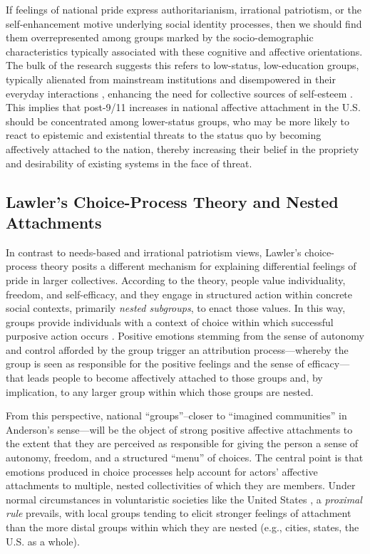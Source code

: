 \documentclass[12pt,letterpaper]{article}
\begin{document}
If feelings of national pride express authoritarianism, irrational patriotism, or the self-enhancement motive underlying social identity processes, then we should find them overrepresented among groups marked by the socio-demographic characteristics typically associated with these cognitive and affective orientations. The bulk of the research suggests this refers to low-status, low-education groups, typically alienated from mainstream institutions and disempowered in their everyday interactions \citep{wuthnow2019left-c34}, enhancing the need for collective sources of self-esteem \citep{collins1986weberian, jost2017working-608, jost2003social-206}. This implies that post-9/11 increases in national affective attachment in the U.S. should be concentrated among lower-status groups, who may be more likely to react to epistemic and existential threats to the status quo by becoming affectively attached to the nation, thereby increasing their belief in the propriety and desirability of existing systems in the face of threat.

\subsection{Lawler's Choice-Process Theory and Nested Attachments}

In contrast to needs-based and irrational patriotism views, Lawler's \citeyearpar{lawler1992affective-8c8} choice-process theory posits a different mechanism for explaining differential feelings of pride in larger collectives. According to the theory, people value individuality, freedom, and self-efficacy, and they engage in structured action within concrete social contexts, primarily \textit{nested subgroups}, to enact those values. In this way, groups provide individuals with a context of choice within which successful purposive action occurs \citep{fine2021hinge}. Positive emotions stemming from the sense of autonomy and control afforded by the group trigger an attribution process---whereby the group is seen as responsible for the positive feelings and the sense of efficacy---that leads people to become affectively attached to those groups and, by implication, to any larger group within which those groups are nested.

From this perspective, national ``groups''--closer to ``imagined communities'' in Anderson's \citeyearpar{anderson1991imagined-c99} sense---will be the object of strong positive affective attachments to the extent that they are perceived as responsible for giving the person a sense of autonomy, freedom, and a structured ``menu'' of choices. The central point is that emotions produced in choice processes help account for actors' affective attachments to multiple, nested collectivities of which they are members. Under normal circumstances in voluntaristic societies like the United States \citep{swidler1992inequality}, a \textit{proximal rule} prevails, with local groups tending to elicit stronger feelings of attachment than the more distal groups within which they are nested (e.g., cities, states, the U.S. as a whole). 
\end{document}
